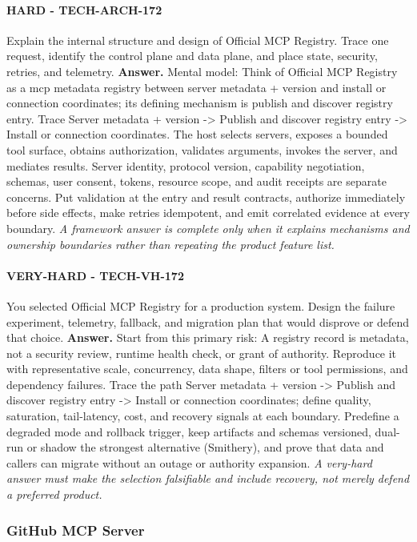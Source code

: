 \paragraph{HARD - TECH-ARCH-172} Explain the internal structure and design of Official MCP Registry. Trace one request, identify the control plane and data plane, and place state, security, retries, and telemetry.
\textbf{Answer.} Mental model: Think of Official MCP Registry as a mcp metadata registry between server metadata + version and install or connection coordinates; its defining mechanism is publish and discover registry entry. Trace Server metadata + version -> Publish and discover registry entry -> Install or connection coordinates. The host selects servers, exposes a bounded tool surface, obtains authorization, validates arguments, invokes the server, and mediates results. Server identity, protocol version, capability negotiation, schemas, user consent, tokens, resource scope, and audit receipts are separate concerns. Put validation at the entry and result contracts, authorize immediately before side effects, make retries idempotent, and emit correlated evidence at every boundary.
\textit{A framework answer is complete only when it explains mechanisms and ownership boundaries rather than repeating the product feature list.}
\paragraph{VERY-HARD - TECH-VH-172} You selected Official MCP Registry for a production system. Design the failure experiment, telemetry, fallback, and migration plan that would disprove or defend that choice.
\textbf{Answer.} Start from this primary risk: A registry record is metadata, not a security review, runtime health check, or grant of authority. Reproduce it with representative scale, concurrency, data shape, filters or tool permissions, and dependency failures. Trace the path Server metadata + version -> Publish and discover registry entry -> Install or connection coordinates; define quality, saturation, tail-latency, cost, and recovery signals at each boundary. Predefine a degraded mode and rollback trigger, keep artifacts and schemas versioned, dual-run or shadow the strongest alternative (Smithery), and prove that data and callers can migrate without an outage or authority expansion.
\textit{A very-hard answer must make the selection falsifiable and include recovery, not merely defend a preferred product.}
\subsubsection*{GitHub MCP Server}
